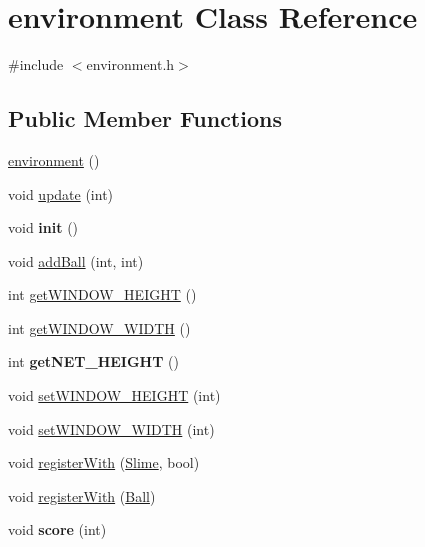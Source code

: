 \hypertarget{classenvironment}{\section{environment Class Reference}
\label{classenvironment}
}


{\ttfamily \#include $<$environment.\-h$>$}

\subsection*{Public Member Functions}
\begin{DoxyCompactItemize}
\item 
\hyperlink{classenvironment_aaff2c2f57d25e0af6981a673e0b85045}{environment} ()
\item 
void \hyperlink{classenvironment_acbd5c1e053c91847f7605cd8b29e7a10}{update} (int)
\item 
\hypertarget{classenvironment_ab8fa5dc66ae9a7cfd921f0097f6ff317}{void {\bfseries init} ()}\label{classenvironment_ab8fa5dc66ae9a7cfd921f0097f6ff317}

\item 
void \hyperlink{classenvironment_abfe6af8bba0929f848e73a0fa279fd1c}{add\-Ball} (int, int)
\item 
int \hyperlink{classenvironment_a4106cb73fcead35475ae8c33ffe89942}{get\-W\-I\-N\-D\-O\-W\-\_\-\-H\-E\-I\-G\-H\-T} ()
\item 
int \hyperlink{classenvironment_acb1222ce73320ac1aec5721f5c2783b6}{get\-W\-I\-N\-D\-O\-W\-\_\-\-W\-I\-D\-T\-H} ()
\item 
\hypertarget{classenvironment_a1f9d00c3197390de97d385e5871d92b2}{int {\bfseries get\-N\-E\-T\-\_\-\-H\-E\-I\-G\-H\-T} ()}\label{classenvironment_a1f9d00c3197390de97d385e5871d92b2}

\item 
void \hyperlink{classenvironment_a5e9a836194ff2b790e84a884d4dd09bf}{set\-W\-I\-N\-D\-O\-W\-\_\-\-H\-E\-I\-G\-H\-T} (int)
\item 
void \hyperlink{classenvironment_a64a6ec127866efa6a1e49e1700fea83b}{set\-W\-I\-N\-D\-O\-W\-\_\-\-W\-I\-D\-T\-H} (int)
\item 
void \hyperlink{classenvironment_a07df3c9f4baeecc67f94bd3eacf8e151}{register\-With} (\hyperlink{classSlime}{Slime}, bool)
\item 
void \hyperlink{classenvironment_acd0761acd4b21d3a49be966046af11cf}{register\-With} (\hyperlink{classBall}{Ball})
\item 
\hypertarget{classenvironment_a63d3437ab81498e7b884208f3f457711}{void {\bfseries score} (int)}\label{classenvironment_a63d3437ab81498e7b884208f3f457711}


\end{DoxyCompactItemize}
